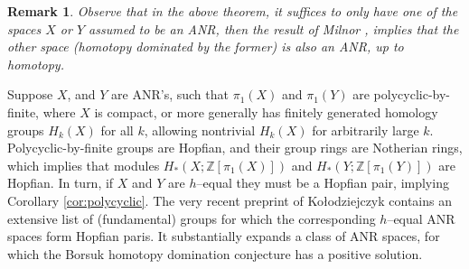 \documentclass[reqno,12pt]{amsart}
\theoremstyle{ourremark}
\newtheorem{remark}[theorem]{Remark}
\numberwithin{equation}{section}
\numberwithin{theorem}{section}
\begin{document}
\begin{remark}\label{rem:only-1}
Observe that in the above theorem, it suffices to only have one of the spaces $X$ or $Y$ assumed to be an ANR, then the result of Milnor \cite{Milnor59}, implies that the other space (homotopy dominated by the former) is also an ANR, up to homotopy. 
\end{remark}
Suppose $X$, and $Y$ are ANR's, such that $\pi_1(X)$ and $\pi_1(Y)$ are polycyclic-by-finite, where $X$ is compact, or more generally has finitely generated homology groups $H_k(X)$ for all $k$, allowing nontrivial $H_k(X)$ for arbitrarily large $k$. Polycyclic-by-finite groups are Hopfian, and their group rings are Notherian rings, which implies that modules $H_\ast(X;{\mathbb{Z}}[\pi_1(X)])$ and $H_\ast(Y;{\mathbb{Z}}[\pi_1(Y)])$ are Hopfian. In turn,  if $X$ and $Y$ are $h$--equal they must be a Hopfian pair, implying Corollary \ref{cor:polycyclic}. The very recent preprint of Ko{\l}odziejczyk \cite{Kolodziejczyk14-preprint} contains an extensive list of (fundamental) groups for which the corresponding $h$--equal ANR spaces form Hopfian paris. It substantially expands a class of ANR spaces, for which the Borsuk homotopy domination conjecture has a positive solution. 
\end{document}
